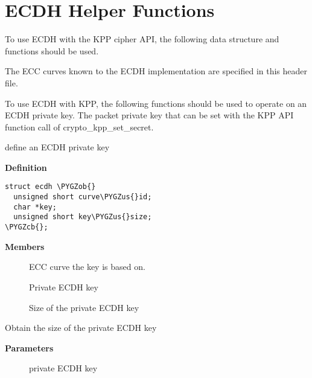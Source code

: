 \documentclass[a4paper,8pt,english]{sphinxmanual}
\def\PYGZus{\char`\_}
\def\PYGZob{\char`\{}
\def\PYGZcb{\char`\}}
\begin{document}
\section{ECDH Helper Functions}
\label{crypto/api-kpp:ecdh-helper-functions}
To use ECDH with the KPP cipher API, the following data structure and
functions should be used.

The ECC curves known to the ECDH implementation are specified in this
header file.

To use ECDH with KPP, the following functions should be used to operate on
an ECDH private key. The packet private key that can be set with
the KPP API function call of crypto\_kpp\_set\_secret.

\begin{fulllineitems}
\label{crypto/api-kpp:c.ecdh}
define an ECDH private key

\end{fulllineitems}


\textbf{Definition}

\begin{Verbatim}[commandchars=\\\{\}]
struct ecdh \PYGZob{}
  unsigned short curve\PYGZus{}id;
  char *key;
  unsigned short key\PYGZus{}size;
\PYGZcb{};
\end{Verbatim}

\textbf{Members}
\begin{description}
\item[{}] \leavevmode
ECC curve the key is based on.

\item[{}] \leavevmode
Private ECDH key

\item[{}] \leavevmode
Size of the private ECDH key

\end{description}

\begin{fulllineitems}
\label{crypto/api-kpp:c.crypto_ecdh_key_len}
Obtain the size of the private ECDH key

\end{fulllineitems}


\textbf{Parameters}
\begin{description}
\item[{}] \leavevmode
private ECDH key

\end{description}
\end{document}
